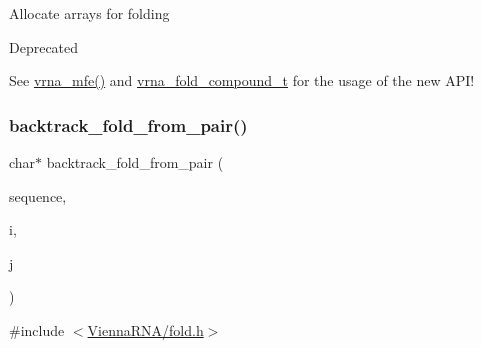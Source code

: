 Allocate arrays for folding~\newline
\begin{DoxyRefDesc}{Deprecated}
\item[\mbox{\hyperlink{deprecated__deprecated000082}{Deprecated}}]See \mbox{\hyperlink{group__mfe__fold_gabd3b147371ccf25c577f88bbbaf159fd}{vrna\+\_\+mfe()}} and \mbox{\hyperlink{group__fold__compound_ga1b0cef17fd40466cef5968eaeeff6166}{vrna\+\_\+fold\+\_\+compound\+\_\+t}} for the usage of the new A\+P\+I!\end{DoxyRefDesc}
\mbox{\label{group__mfe__fold__single_ga33c35bfd60df9d7a97aec72b887e6858}} 
\subsubsection{\texorpdfstring{backtrack\+\_\+fold\+\_\+from\+\_\+pair()}{backtrack\_fold\_from\_pair()}}
{\footnotesize\ttfamily char$\ast$ backtrack\+\_\+fold\+\_\+from\+\_\+pair (\begin{DoxyParamCaption}\item[{char $\ast$}]{sequence,  }\item[{int}]{i,  }\item[{int}]{j }\end{DoxyParamCaption})}



{\ttfamily \#include $<$\mbox{\hyperlink{fold_8h}{Vienna\+R\+N\+A/fold.\+h}}$>$}

